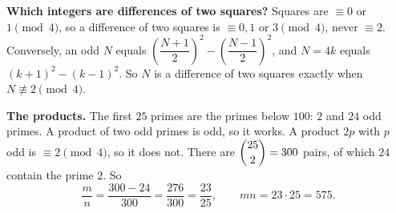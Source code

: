 \textbf{Which integers are differences of two squares?} Squares are $\equiv0$ or $1\pmod4$, so a difference of two squares is $\equiv0,1$ or $3\pmod4$, never $\equiv2$. Conversely, an odd $N$ equals $\left(\dfrac{N+1}2\right)^2-\left(\dfrac{N-1}2\right)^2$, and $N=4k$ equals $(k+1)^2-(k-1)^2$. So $N$ is a difference of two squares exactly when $N\not\equiv2\pmod4$.

\textbf{The products.} The first $25$ primes are the primes below $100$: $2$ and $24$ odd primes. A product of two odd primes is odd, so it works. A product $2p$ with $p$ odd is $\equiv2\pmod4$, so it does not. There are $\dbinom{25}{2}=300$ pairs, of which $24$ contain the prime $2$. So
\[\dfrac mn=\dfrac{300-24}{300}=\dfrac{276}{300}=\dfrac{23}{25},\qquad mn=23\cdot25=\boxed{575}.\]
